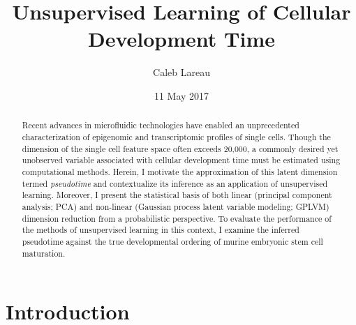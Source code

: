 \documentclass[english, 11pt]{article}\usepackage[]{graphicx}\usepackage[]{color}
\begin{document}
\title{Unsupervised Learning of Cellular Development Time}


\author{Caleb Lareau}


\date{11 May 2017}
\maketitle
\begin{abstract}
\noindent Recent advances in microfluidic technologies have enabled an unprecedented characterization of epigenomic and transcriptomic profiles of single cells. Though the dimension of the single cell feature space often exceeds 20,000, a commonly desired yet unobserved variable associated with cellular development time must be estimated using computational methods. Herein, I motivate the approximation of this latent dimension termed \textit{pseudotime} and contextualize its inference as an application of unsupervised learning. Moreover, I present the statistical basis of both linear (principal component analysis; PCA) and non-linear (Gaussian process latent variable modeling; GPLVM) dimension reduction from a probabilistic perspective. To evaluate the performance of the methods of unsupervised learning in this context, I examine the inferred pseudotime against the true developmental ordering of murine embryonic stem cell maturation. 

\newpage{}
\end{abstract}





\section{Introduction}
\end{document}
